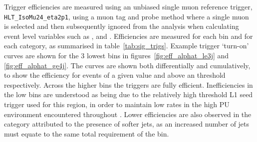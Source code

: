 Trigger efficiencies are measured using an unbiased single muon reference
trigger,
\\\verb!HLT_IsoMu24_eta2p1!, using a muon tag and probe method where a
single muon is selected and then subsequently ignored from the analysis when 
calculating event level variables such as \HT, \mht and \alphat. Efficiencies 
are measured for each \HT bin and for each \nj category, as summarised in 
table~\ref{tab:sig_trigs}. Example trigger `turn-on' curves are shown for the 3 
lowest \HT bins in figures~\ref{fig:eff_alphat_le3j} and \ref{fig:eff_alphat_ge4j}.
The curves are shown both differentially and cumulatively, to show the
efficiency for events of a given \alphat value and above an \alphat threshold
respectively.
Across the higher \HT 
bins the triggers are fully efficient. Inefficiencies in the low \HT bins are
understood as being due to the relatively high threshold L1 seed trigger used
for this region, in order to maintain
low rates in the high PU environment encountered throughout \runone. Lower 
efficiencies are also observed in the \njhigh category attributed to the presence of 
softer jets, as an increased number of jets must equate to the same total \HT 
requirement of the bin.

